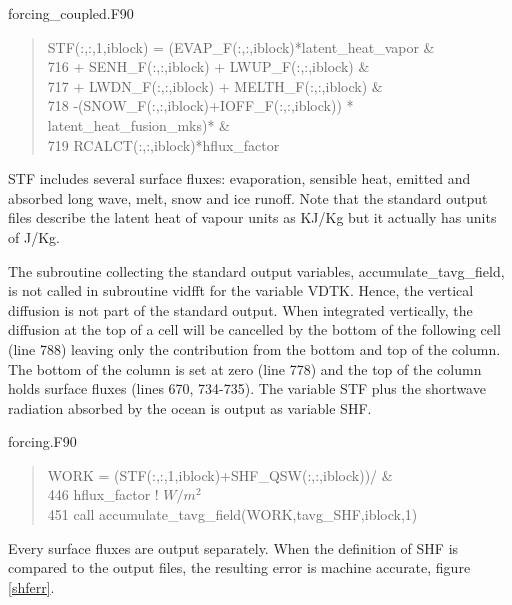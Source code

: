 \begin{appendices}
\begin{center} forcing\_coupled.F90 \end{center}
\begin{quotation}
\small
\linespread{0.5}\selectfont{} \hspace{1em}     STF(:,:,1,iblock) = (EVAP\_F(:,:,iblock)*latent\_heat\_vapor             \&\\
716 \hspace{1em}                          + SENH\_F(:,:,iblock) + LWUP\_F(:,:,iblock)        \&\\
717 \hspace{1em}                          + LWDN\_F(:,:,iblock) + MELTH\_F(:,:,iblock)       \&\\
718 \hspace{1em}                          -(SNOW\_F(:,:,iblock)+IOFF\_F(:,:,iblock)) * latent\_heat\_fusion\_mks)*  \&\\
719 \hspace{1em}                            RCALCT(:,:,iblock)*hflux\_factor 
\end{quotation}
STF includes several surface fluxes: evaporation, sensible heat, emitted and absorbed long wave, melt, snow and ice runoff. Note that the standard output files describe the latent heat of vapour units as KJ/Kg but it actually has units of J/Kg.

The subroutine collecting the standard output variables, accumulate\_tavg\_field, is not called in subroutine vidfft for the variable VDTK. Hence, the vertical diffusion is not part of the standard output.  When integrated vertically, the diffusion at the top of a cell will be cancelled by the bottom of the following cell (line 788) leaving only the contribution from the bottom and top of the column. The bottom of the column is set at zero (line 778) and the top of the column holds surface fluxes (lines 670, 734-735). The variable STF plus the shortwave radiation absorbed by the ocean is output as variable SHF. 
\begin{center} forcing.F90 \end{center}
\begin{quotation}
\small
\linespread{0.5}\selectfont{} \hspace{1em}       WORK = (STF(:,:,1,iblock)+SHF\_QSW(:,:,iblock))/ \&\\
446 \hspace{1em}                  hflux\_factor ! $W/m^2$\\
451 \hspace{1em}        call accumulate\_tavg\_field(WORK,tavg\_SHF,iblock,1)\\
\end{quotation}
Every surface fluxes are output separately. When the definition of SHF is compared to the output files, the resulting error is machine accurate, figure \ref{shferr}. 


\end{appendices}
